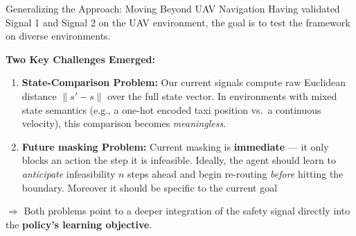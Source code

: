 \documentclass[11pt,aspectratio=169]{beamer}
\begin{document}
\begin{frame}{Generalizing the Approach: Moving Beyond UAV Navigation}
    Having validated Signal 1 and Signal 2 on the UAV environment, the goal is to test the framework on diverse environments.

    \vspace{0.2cm}
    \textbf{Two Key Challenges Emerged:}
    \begin{enumerate}
        \item \textbf{State-Comparison Problem:} Our current signals compute raw Euclidean distance $\|s' - s\|$ over the full state vector. In environments with mixed state semantics (e.g., a one-hot encoded taxi position vs.~a continuous velocity), this comparison becomes \textit{meaningless}.
        \vspace{0.1cm}
        \item \textbf{Future masking Problem:} Current masking is \textbf{immediate} — it only blocks an action the step it is infeasible. Ideally, the agent should learn to \textit{anticipate} infeasibility $n$ steps ahead and begin re-routing \textit{before} hitting the boundary. Moreover it should be specific to the current goal
    \end{enumerate}

    \vspace{0.2cm}
    $\Rightarrow$ Both problems point to a deeper integration of the safety signal directly into the \textbf{policy's learning objective}.
\end{frame}
\end{document}
